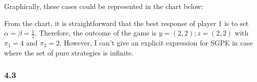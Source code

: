 \documentclass[]{article}
\begin{document}
Graphically, these cases could be represented in the chart below:

\begin{figure}[h]
	\centering
\end{figure}

From the chart, it is straightforward that the best response of player 1 is to set $\alpha = \beta = \frac{1}{2}$. Therefore, the outcome of the game is $y = (2, 2); z = (2, 2)$ with $\pi_1 = 4$ and $\pi_2 = 2$. However, I can't give an explicit expression for SGPE in case where the set of pure strategies is infinite.

\subsubsection*{4.3}
\end{document}
